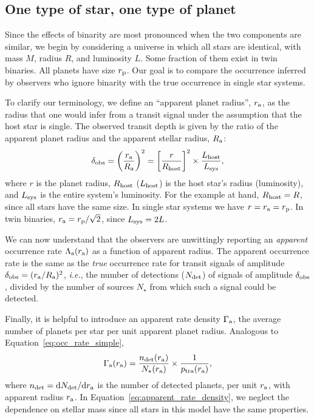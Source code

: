 \documentclass[12pt,modern]{aastex61}
\renewcommand{\a}{_{\rm a}}
\newcommand{\p}{_{\rm p}}
\begin{document}
\subsection{One type of star, one type of planet}
\label{sec:model_1}

Since the effects of binarity are most pronounced when the two
components are similar, we begin by considering a universe in which
all stars are identical, with mass $M$, radius $R$, and luminosity
$L$.  Some fraction of them exist in twin binaries.
All planets have size $r\p$.
Our goal is to compare the occurrence inferred by observers who
ignore binarity with the true occurrence in single star systems.

To clarify our terminology, we define an ``apparent planet radius'', $r\a$, as 
the radius that one would infer from a transit signal under the assumption 
that the host star is single.
The observed transit depth is given by the ratio of the apparent planet
radius and the apparent stellar radius, $R\a$:
\begin{equation}
\delta_{\rm obs}
= \left(\frac{r\a}{R\a}\right)^2
= \left[{r\over R_{\rm host}}\right]^2\times {L_{\rm host} \over L_{\rm 
        sys}},
\label{eq:delta_obs_general} 
\end{equation}
where $r$ is the planet radius, $R_{\rm host}$ ($L_{\rm host}$) is the 
host star's radius (luminosity), and $L_{\rm sys}$ is the 
entire system's luminosity.
For the example at hand, $R_{\rm host} = R$, since all stars have the same 
size. In single star systems we have $r=r\a=r\p$. In twin binaries, 
$r\a=r\p/\sqrt{2}$, since $L_{\rm sys}=2L$.

We can now understand that the observers are unwittingly
reporting an {\it apparent} occurrence rate $\Lambda\a(r\a)$ as
a function of apparent radius.
The apparent occurrence rate is the same as the {\it true} occurrence rate for 
transit signals of 
amplitude $\delta_{\rm obs} = (r\a/R\a)^2$, \textit{i.e.}, the number of 
detections ($N_{\rm det}$) of signals of amplitude $\delta_{\rm obs}$, divided 
by the number of sources $N_\star$ from which such a signal could be detected.

Finally, it is helpful to introduce an apparent rate density 
$\Gamma\a$, the average number of planets per star per unit apparent planet 
radius. Analogous to Equation~\ref{eq:occ_rate_simple},  
\begin{equation}
\Gamma\a(r\a) = \frac{n_{\rm det}(r\a)}{N_\star(r\a)}
\times \frac{1}{p_{\rm tra}(r\a)},
\label{eq:apparent_rate_density}
\end{equation}
where $n_{\rm det}={\rm d}N_{\rm det}/{\rm d}r\a$ is the number  
of detected planets, per unit $r\a$, with apparent radius $r\a$.
In Equation~\ref{eq:apparent_rate_density}, we neglect the dependence on 
stellar mass since all stars in this model have the same properties.
\end{document}
